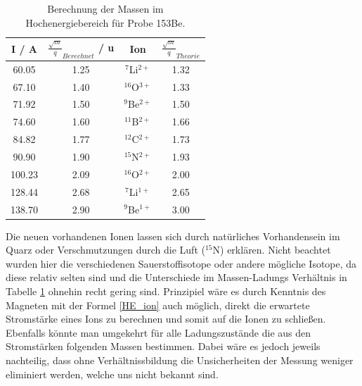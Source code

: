 \begin{table}[H]
    \centering
    \caption{Berechnung der Massen im Hochenergiebereich für Probe 153Be.}
    \begin{tabular}{|c |c| c|c|}
        \hline
        I / \si{A} & $\frac{\sqrt{m}}{q}_{Berechnet}$ / \si{\atomicmassunit} & Ion & $\frac{\sqrt{m}}{q}_{Theorie}$ \\
        \hline
        \num{60.05}   & \num{1.25} &  $^{7}$Li$^{2+}$ & \num{1.32} \\
        \num{67.10}   & \num{1.40} &  $^{16}$O$^{3+}$ & \num{1.33} \\
        \num{71.92}  & \num{1.50}  &  $^{9}$Be$^{2+}$ & \num{1.50}\\
        \num{74.60}  & \num{1.60}  &  $^{11}$B$^{2+}$ & \num{1.66}\\
        \num{84.82}  & \num{1.77}  &  $^{12}$C$^{2+}$ & \num{1.73}\\
        \num{90.90}  & \num{1.90}  &  $^{15}$N$^{2+}$ & \num{1.93}\\
        \num{100.23} & \num{2.09} &  $^{16}$O$^{2+}$  & \num{2.00}\\
        \num{128.44} & \num{2.68} &  $^{7}$Li$^{1+}$  & \num{2.65}\\
        \num{138.70} & \num{2.90} &  $^{9}$Be$^{1+}$  & \num{3.00}\\
        \hline
    \end{tabular}
    \label{highenergy}
\end{table}

Die neuen vorhandenen Ionen lassen sich durch natürliches Vorhandensein im Quarz oder Verschmutzungen durch die Luft ($^{15}$N) erklären.
Nicht beachtet wurden hier die verschiedenen Sauerstoffisotope oder andere mögliche Isotope, da diese relativ selten sind und die Unterschiede im Massen-Ladungs Verhältnis in Tabelle \ref{highenergy} ohnehin recht gering sind.
Prinzipiel wäre es durch Kenntnis des Magneten mit der Formel \ref{HE_ion} auch möglich, direkt die erwartete Stromstärke eines Ions zu berechnen und somit auf die Ionen zu schließen. Ebenfalls könnte man umgekehrt für alle Ladungszustände die aus den Stromstärken folgenden Massen bestimmen.
Dabei wäre es jedoch jeweils nachteilig, dass ohne Verhältnissbildung die Unsicherheiten der Messung weniger eliminiert werden, welche uns nicht bekannt sind.

\clearpage

